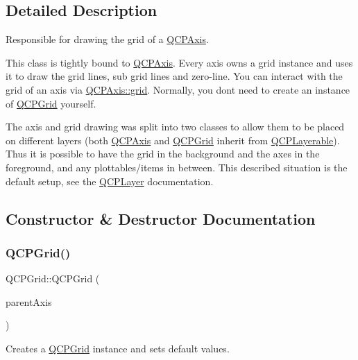 \subsection{Detailed Description}
Responsible for drawing the grid of a \mbox{\hyperlink{class_q_c_p_axis}{Q\+C\+P\+Axis}}. 

This class is tightly bound to \mbox{\hyperlink{class_q_c_p_axis}{Q\+C\+P\+Axis}}. Every axis owns a grid instance and uses it to draw the grid lines, sub grid lines and zero-\/line. You can interact with the grid of an axis via \mbox{\hyperlink{class_q_c_p_axis_a63f1dd2df663680d2a8d06c19592dd63}{Q\+C\+P\+Axis\+::grid}}. Normally, you don\textquotesingle{}t need to create an instance of \mbox{\hyperlink{class_q_c_p_grid}{Q\+C\+P\+Grid}} yourself.

The axis and grid drawing was split into two classes to allow them to be placed on different layers (both \mbox{\hyperlink{class_q_c_p_axis}{Q\+C\+P\+Axis}} and \mbox{\hyperlink{class_q_c_p_grid}{Q\+C\+P\+Grid}} inherit from \mbox{\hyperlink{class_q_c_p_layerable}{Q\+C\+P\+Layerable}}). Thus it is possible to have the grid in the background and the axes in the foreground, and any plottables/items in between. This described situation is the default setup, see the \mbox{\hyperlink{class_q_c_p_layer}{Q\+C\+P\+Layer}} documentation. 

\subsection{Constructor \& Destructor Documentation}
\mbox{\label{class_q_c_p_grid_acd1cdd2909625388a13048b698494a17}} 
\subsubsection{\texorpdfstring{Q\+C\+P\+Grid()}{QCPGrid()}}
{\footnotesize\ttfamily Q\+C\+P\+Grid\+::\+Q\+C\+P\+Grid (\begin{DoxyParamCaption}\item[{\mbox{\hyperlink{class_q_c_p_axis}{Q\+C\+P\+Axis}} $\ast$}]{parent\+Axis }\end{DoxyParamCaption})\hspace{0.3cm}{\ttfamily [explicit]}}

Creates a \mbox{\hyperlink{class_q_c_p_grid}{Q\+C\+P\+Grid}} instance and sets default values.

